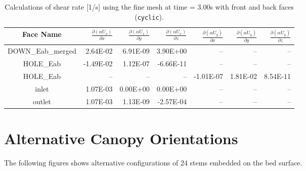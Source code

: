 \begin{table}[H]
\begin{centering}
\begin{tabular}{|c|r|r|r|r|r|r|}
\hline 
Face Name & $\frac{\partial(\alpha U_{x})}{\partial x}$ & $\frac{\partial(\alpha U_{x})}{\partial y}$ & $\frac{\partial(\alpha U_{x})}{\partial z}$ & $\frac{\partial(\alpha U_{y})}{\partial x}$ & $\frac{\partial(\alpha U_{y})}{\partial y}$ & $\frac{\partial(\alpha U_{y})}{\partial z}$\tabularnewline
\hline 
\hline 
DOWN\_Eab\_merged & 2.64E-02 & 6.91E-09 & 3.90E+00 & -- & -- & --\tabularnewline
\hline 
HOLE\_Eab & -1.49E-02 & 1.12E-07 & -6.66E-11 & -- & -- & --\tabularnewline
\hline 
HOLE\_Eab & -- & -- & -- & -1.01E-07 & 1.81E-02 & 8.54E-11\tabularnewline
\hline 
inlet & 1.07E-03 & 0.00E+00 & 0.00E+00 & -- & -- & --\tabularnewline
\hline 
outlet & 1.07E-03 & 1.13E-09 & -2.57E-04 & -- & -- & --\tabularnewline
\hline 
\end{tabular}\caption{Calculations of shear rate {[}1/s{]} using the fine mesh at time =
3.00s with front and back faces (\texttt{cyclic}).}
\par\end{centering}
\label{tbl:fine_mesh_shear_rate}
\end{table}


\section{Alternative Canopy Orientations}

The following figures shows alternative configurations of 24 stems
embedded on the bed surface. 

